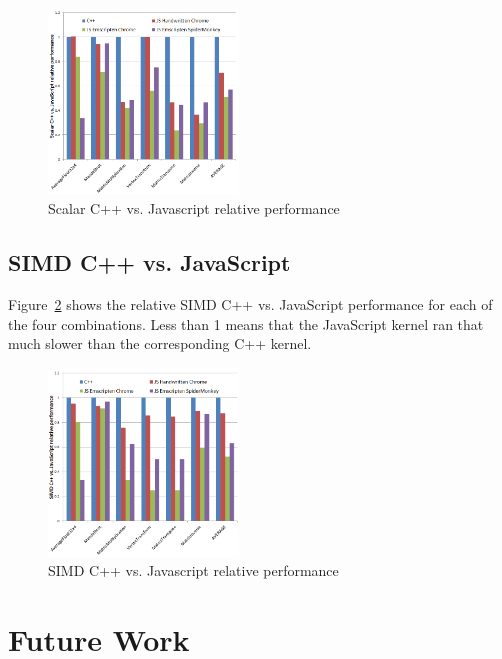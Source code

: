 \documentclass[preprint]{sigplanconf}
\begin{document}
\begin{figure}
\begin{center}
\includegraphics[width=0.45\textwidth]{figures/cpp-js-scalar.png}
\end{center}
\caption{Scalar C++ vs. Javascript relative performance}
\label{fig:cpp-js-scalar}
\end{figure}

\subsection{SIMD C++ vs. JavaScript}

Figure~\ref{fig:cpp-js-simd} shows the relative SIMD C++ vs. JavaScript
performance for each of the four combinations. Less than 1 means that the 
JavaScript kernel ran that much slower than the corresponding C++ kernel.

\begin{figure}
\begin{center}
\includegraphics[width=0.45\textwidth]{figures/cpp-js-simd.png}
\end{center}
\caption{SIMD C++ vs. Javascript relative performance}
\label{fig:cpp-js-simd}
\end{figure}

\section{Future Work}
\end{document}
